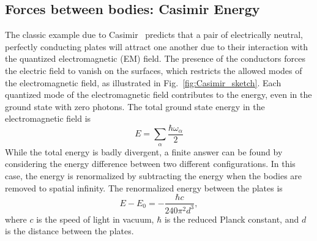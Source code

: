 

\subsection{Forces between bodies: Casimir Energy}

The classic example due to Casimir~\cite{Casimir1948} predicts that a pair of electrically neutral,
perfectly conducting plates will attract one another due to their interaction with the quantized 
electromagnetic (EM) field.  
The presence of the conductors forces the electric field to vanish on the surfaces,
which restricts the allowed modes of the electromagnetic field, as illustrated in Fig.~\ref{fig:Casimir_sketch}.
Each quantized mode of the electromagnetic field contributes
to the energy, even in the ground state with zero photons.
  The total ground state energy in the electromagnetic field is 
\begin{equation}
  E=\sum_\alpha\frac{\hbar\omega_{\alpha}}{2}
\end{equation}
While the total energy is badly divergent, a finite answer can be found by considering 
the energy difference between two different configurations.  
In this case, the energy is renormalized by subtracting the energy when the bodies are removed to spatial infinity.  
The renormalized energy between the plates is
\begin{equation}
  E-E_0 = -\frac{\hbar c}{240\pi^2 d^3},\label{eq:Casimir_energy}
\end{equation}
where $c$ is the speed of light in vacuum, $\hbar$ is the reduced Planck constant,
and $d$ is the distance between the plates.  %

